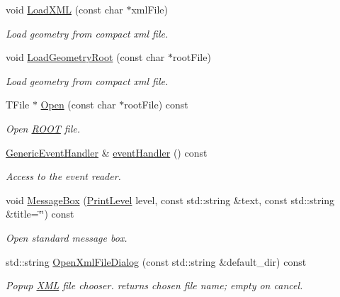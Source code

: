 \begin{DoxyCompactItemize}
void \hyperlink{class_d_d4hep_1_1_display_ade2c0fff0fb152ea4605c30c5516c319}{LoadXML} (const char $\ast$xmlFile)
\begin{DoxyCompactList}\small\item\em Load geometry from compact xml file. \item\end{DoxyCompactList}\item 
void \hyperlink{class_d_d4hep_1_1_display_a6f599f1026155bd68b860fa4f9904d62}{LoadGeometryRoot} (const char $\ast$rootFile)
\begin{DoxyCompactList}\small\item\em Load geometry from compact xml file. \item\end{DoxyCompactList}\item 
TFile $\ast$ \hyperlink{class_d_d4hep_1_1_display_a5ff3cbb2776e91975554ca8beedc82d9}{Open} (const char $\ast$rootFile) const 
\begin{DoxyCompactList}\small\item\em Open \hyperlink{namespace_r_o_o_t}{ROOT} file. \item\end{DoxyCompactList}\item 
\hyperlink{class_d_d4hep_1_1_generic_event_handler}{GenericEventHandler} \& \hyperlink{class_d_d4hep_1_1_display_ae34aaf5ab6c230281e4804632cb9eb7e}{eventHandler} () const 
\begin{DoxyCompactList}\small\item\em Access to the event reader. \item\end{DoxyCompactList}\item 
void \hyperlink{class_d_d4hep_1_1_display_ad4ed1bcbf85919e1ae80d597329a42e1}{MessageBox} (\hyperlink{namespace_d_d4hep_a5b5a64d56252469451f2020a27d57d42}{PrintLevel} level, const std::string \&text, const std::string \&title=\char`\"{}\char`\"{}) const 
\begin{DoxyCompactList}\small\item\em Open standard message box. \item\end{DoxyCompactList}\item 
std::string \hyperlink{class_d_d4hep_1_1_display_ad88a62cc1e8be8b6efb31db8771930d3}{OpenXmlFileDialog} (const std::string \&default\_\-dir) const 
\begin{DoxyCompactList}\small\item\em Popup \hyperlink{namespace_d_d4hep_1_1_x_m_l}{XML} file chooser. returns chosen file name; empty on cancel. \item\end{DoxyCompactList}\item 

\end{DoxyCompactItemize}
